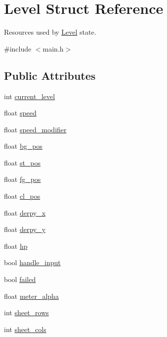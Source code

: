 \hypertarget{structLevel}{\section{\-Level \-Struct \-Reference}
\label{structLevel}
}


\-Resources used by \hyperlink{structLevel}{\-Level} state.  




{\ttfamily \#include $<$main.\-h$>$}

\subsection*{\-Public \-Attributes}
\begin{DoxyCompactItemize}
\item 
int \hyperlink{structLevel_a1ba3ee0104c912dde5d6e70fee889512}{current\-\_\-level}
\item 
float \hyperlink{structLevel_a936a1d131d1e056878474ca831c5e88f}{speed}
\item 
float \hyperlink{structLevel_a0f6fa70a2e0b85437dc1973d1409381f}{speed\-\_\-modifier}
\item 
float \hyperlink{structLevel_a00321214fdc30f67615053d1ca614948}{bg\-\_\-pos}
\item 
float \hyperlink{structLevel_ab13f799d9e2e06a04debbd97676fb512}{st\-\_\-pos}
\item 
float \hyperlink{structLevel_a665bb93951ab6b7a91543712152a3acf}{fg\-\_\-pos}
\item 
float \hyperlink{structLevel_af466533be369b5ce1f48196a7f3b7b0b}{cl\-\_\-pos}
\item 
float \hyperlink{structLevel_ae5a97d5b61c70c63e93992a9ff3935f9}{derpy\-\_\-x}
\item 
float \hyperlink{structLevel_a7b3c0f5af134797a1ed21ef48da3ab00}{derpy\-\_\-y}
\item 
float \hyperlink{structLevel_a49df009e8113251cfcb48fe17df0b571}{hp}
\item 
bool \hyperlink{structLevel_a06cf4f2da517284d2006540051d3e5c0}{handle\-\_\-input}
\item 
bool \hyperlink{structLevel_a5bea34b31777260f1b23a1d64e6cd865}{failed}
\item 
float \hyperlink{structLevel_a246ce1ecf1523db218cf067df15e511f}{meter\-\_\-alpha}
\item 
int \hyperlink{structLevel_a6d608b79c9b4dd8a5efc0c7e5fb482b0}{sheet\-\_\-rows}
\item 
int \hyperlink{structLevel_a8a5c443169a4ff15f330a65473eedb1b}{sheet\-\_\-cols}

\end{DoxyCompactItemize}
